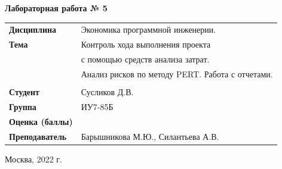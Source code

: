 \documentclass[a4paper,14pt]{extreport} %
\begin{document}
\begin{titlepage}
    \vspace{2cm}

    \begin{center}
        \textbf{Лабораторная работа № 5} \\
        \vspace{0.5cm}
    \end{center}

    \vspace{4cm}

    \begin{flushleft}
        \begin{tabular}{ll}
            \textbf{Дисциплина} & Экономика программной инженерии.  \\
            \textbf{Тема} & Контроль хода выполнения проекта \\ 
            & с помощью средств анализа затрат. \\
            & Анализ рисков по методу PERT. Работа с отчетами. \\
            \\
            \textbf{Студент} & Сусликов Д.В. \\
            \textbf{Группа} & ИУ7-85Б \\
            \textbf{Оценка (баллы)} & \\
            \textbf{Преподаватель} & Барышникова М.Ю., Силантьева А.В.   \\
        \end{tabular}
    \end{flushleft}

    \vspace{4cm}

   \begin{center}
        Москва, 2022 г.
    \end{center}

\end{titlepage}
\end{document}
